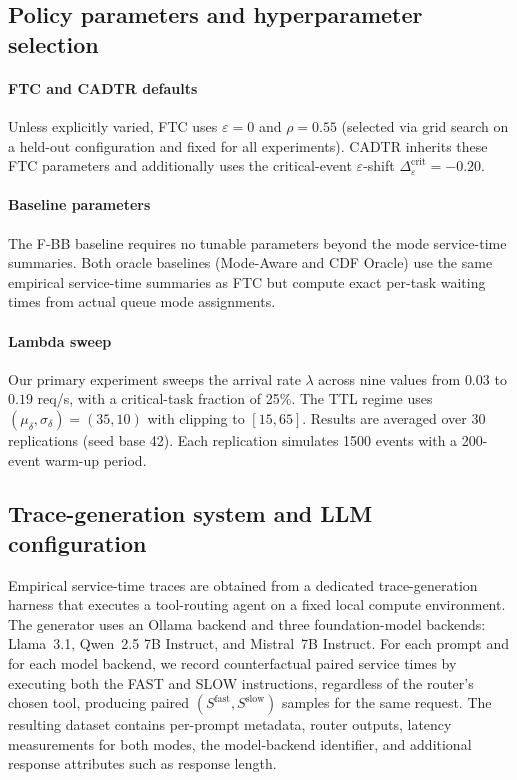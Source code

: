 \documentclass[preprint,12pt]{elsarticle}
\begin{document}
\subsection{Policy parameters and hyperparameter selection}
\label{sec:hyperparams}

\paragraph{FTC and CADTR defaults}
Unless explicitly varied, FTC uses $\varepsilon=0$ and $\rho=0.55$ (selected via grid search on a held-out configuration and fixed for all experiments). CADTR inherits these FTC parameters and additionally uses the critical-event $\varepsilon$-shift $\Delta_{\varepsilon}^{\mathrm{crit}} = -0.20$.

\paragraph{Baseline parameters}
The F-BB baseline requires no tunable parameters beyond the mode service-time summaries. Both oracle baselines (Mode-Aware and CDF Oracle) use the same empirical service-time summaries as FTC but compute exact per-task waiting times from actual queue mode assignments.

\paragraph{Lambda sweep}
Our primary experiment sweeps the arrival rate $\lambda$ across nine values from $0.03$ to $0.19$ req/s, with a critical-task fraction of 25\%. The TTL regime uses $(\mu_\delta, \sigma_\delta) = (35, 10)$ with clipping to $[15, 65]$. Results are averaged over 30 replications (seed base 42). Each replication simulates 1500 events with a 200-event warm-up period.

\subsection{Trace-generation system and LLM configuration}
\label{sec:trace_system}

Empirical service-time traces are obtained from a dedicated trace-generation harness
that executes a tool-routing agent on a fixed local compute environment. The generator
uses an Ollama backend and three foundation-model backends:
Llama~3.1, Qwen~2.5 7B Instruct, and Mistral~7B Instruct.
For each prompt and for each model backend, we record counterfactual paired service
times by executing both the FAST and SLOW instructions, regardless of the router's
chosen tool, producing paired $(S^{\text{fast}}, S^{\text{slow}})$ samples for the same
request. The resulting dataset contains per-prompt metadata, router outputs, latency
measurements for both modes, the model-backend identifier, and additional response
attributes such as response length.
\end{document}
